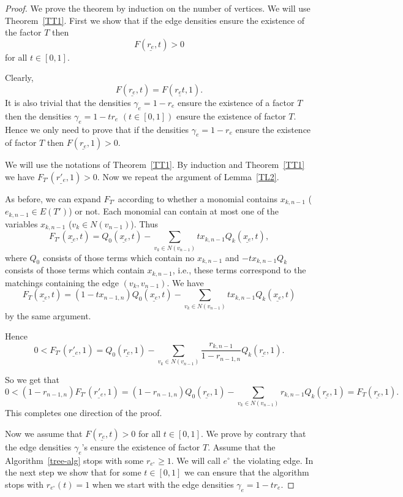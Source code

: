 \documentclass[12pt,a4paper]{amsart}
\numberwithin{equation}{section}
\begin{document}
\begin{proof} We prove the theorem by induction on the number of vertices. We
  will use Theorem~\ref{TT1}. First we show that if the edge
  densities ensure the existence of the factor $T$
  then $$F(\underline{r_e},t)>0$$ for all $t\in [0,1]$.

Clearly,
$$ F(\underline{r_e},t)=F(\underline{r_et},1).$$
It is also trivial  that the  densities $\gamma_e=1-r_e$ ensure the existence
of a factor $T$ then the densities $\gamma_e=1-tr_e$ $(t\in [0,1])$ ensure the
existence of factor $T$. Hence we only need to prove that if the  densities
$\gamma_e=1-r_e$ ensure the existence of factor $T$ then
$F(\underline{r_e},1)>0$.

We will use the notations of Theorem~\ref{TT1}.
By induction and Theorem~\ref{TT1} we have
$F_{T'}(\underline{r'_e},1)>0$. Now we repeat the argument of Lemma~\ref{TL2}.

As before, we can expand $F_{T'}$ 
according to whether a monomial contains $x_{k,n-1}$ ($e_{k,n-1}\in E(T')$) or
not. Each monomial can contain at most one of the variables $x_{k,n-1}$ ($v_k\in
N(v_{n-1})$). Thus 
$$F_{T'}(\underline{x_e},t)=Q_0(\underline{x_e},t)-\sum_{v_k\in
  N(v_{n-1})}tx_{k,n-1}Q_k(\underline{x_e},t),$$
where $Q_0$ consists of those terms which contain no $x_{k,n-1}$ and
$-tx_{k,n-1}Q_k$ consists of those terms which contain $x_{k,n-1}$, i.e.,
these terms correspond to the matchings containing the edge $(v_k,v_{n-1})$.
We have
$$F_{T}(\underline{x_e},t)=(1-tx_{n-1,n})Q_0(\underline{x_e},t)-\sum_{v_k\in
  N(v_{n-1})}tx_{k,n-1}Q_k(\underline{x_e},t)$$
by the same argument.

Hence  
$$0<F_{T'}(\underline{r'_e},1)=Q_0(
\underline{r_e},1)-\sum_{v_k\in
  N(v_{n-1})}\frac{r_{k,n-1}}{1-r_{n-1,n}}Q_k(\underline{r_e},1).$$ 

So we get that
$$0<(1-r_{n-1,n})F_{T'}(\underline{r'_e},1)=(1-r_{n-1,n})Q_0(
\underline{r_e},1)-\sum_{v_k\in
  N(v_{n-1})}r_{k,n-1}Q_k(\underline{r_e},1)=F_{T}(\underline{r_e},1).$$  
This completes one direction of the proof.
\bigskip

Now we assume that $F(\underline{r_e},t)>0$ for all $t\in [0,1]$. We prove by
contrary that the edge densities $\gamma_e$'s ensure the existence of factor
$T$. Assume that the Algorithm~\ref{tree-alg} stops with 
some $r_{e^{\circ}}\geq 1$. We will call $e^{\circ}$ the violating edge. In the next step we show that for some
$t\in [0,1]$ we can ensure that the algorithm stops
with $r_{e^{\circ}}(t)=1$ when we start with the edge densities
$\gamma_e=1-tr_e$. 


\end{proof}
\end{document}
